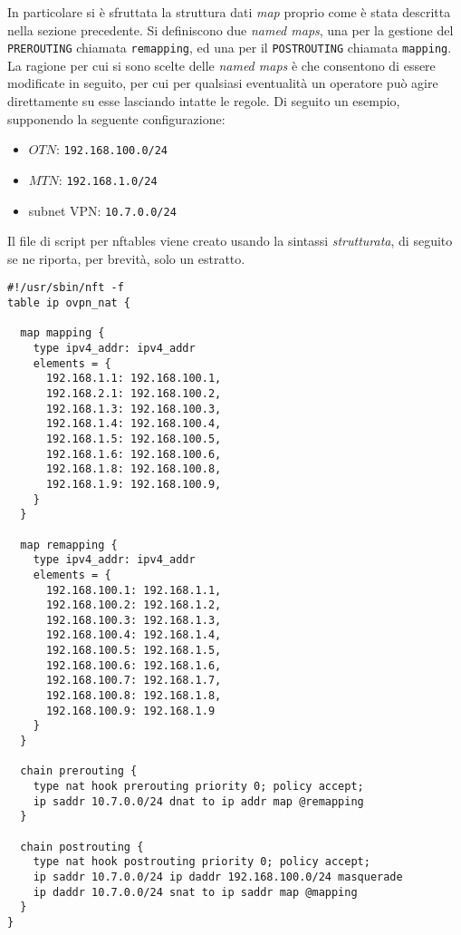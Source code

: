 In particolare si è sfruttata la struttura dati \textit{map} proprio come è stata
descritta nella sezione precedente. Si definiscono due \textit{named maps},
una per la gestione
del \texttt{PREROUTING} chiamata \texttt{remapping}, ed una per il \texttt{POSTROUTING}
chiamata \texttt{mapping}. La ragione per cui si sono scelte delle \textit{named maps}
è che consentono di essere modificate in seguito, per cui per qualsiasi eventualità
un operatore può agire direttamente su esse lasciando intatte le regole.
Di seguito un esempio, supponendo la seguente configurazione:
\begin{itemize}
  \item $OTN$: \texttt{192.168.100.0/24}
  \item $MTN$: \texttt{192.168.1.0/24}
  \item subnet VPN: \texttt{10.7.0.0/24}
\end{itemize}
Il file di script per nftables viene creato usando la sintassi \textit{strutturata},
di seguito se ne riporta, per brevità, solo un estratto.
\begin{verbatim}
#!/usr/sbin/nft -f
table ip ovpn_nat {

  map mapping {
    type ipv4_addr: ipv4_addr
    elements = {
      192.168.1.1: 192.168.100.1,
      192.168.2.1: 192.168.100.2,
      192.168.1.3: 192.168.100.3,
      192.168.1.4: 192.168.100.4,
      192.168.1.5: 192.168.100.5,
      192.168.1.6: 192.168.100.6,
      192.168.1.8: 192.168.100.8,
      192.168.1.9: 192.168.100.9,
    }
  }

  map remapping {
    type ipv4_addr: ipv4_addr
    elements = {
      192.168.100.1: 192.168.1.1,
      192.168.100.2: 192.168.1.2,
      192.168.100.3: 192.168.1.3,
      192.168.100.4: 192.168.1.4,
      192.168.100.5: 192.168.1.5,
      192.168.100.6: 192.168.1.6,
      192.168.100.7: 192.168.1.7,
      192.168.100.8: 192.168.1.8,
      192.168.100.9: 192.168.1.9      
    }
  }

  chain prerouting {
    type nat hook prerouting priority 0; policy accept;
    ip saddr 10.7.0.0/24 dnat to ip addr map @remapping
  }

  chain postrouting {
    type nat hook postrouting priority 0; policy accept;
    ip saddr 10.7.0.0/24 ip daddr 192.168.100.0/24 masquerade
    ip daddr 10.7.0.0/24 snat to ip saddr map @mapping
  }
}
\end{verbatim}
